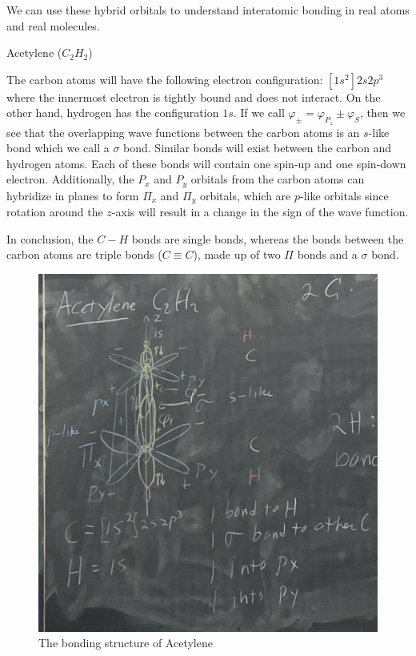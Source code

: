 \documentclass[a4paper,twoside,master.tex]{subfiles}
\begin{document}
We can use these hybrid orbitals to understand interatomic bonding in real atoms and real molecules.

\begin{ex}
    Acetylene ($ C_2 H_2 $)
    
    The carbon atoms will have the following electron configuration: $ [1s^2]2s2p^3 $ where the innermost electron is tightly bound and does not interact. On the other hand, hydrogen has the configuration $ 1s $. If we call $ \varphi_{\pm} = \varphi_{P_z} \pm \varphi_{S} $, then we see that the overlapping wave functions between the carbon atoms is an $ s $-like bond which we call a $ \sigma $ bond. Similar bonds will exist between the carbon and hydrogen atoms. Each of these bonds will contain one spin-up and one spin-down electron. Additionally, the $ P_x $ and $ P_y $ orbitals from the carbon atoms can hybridize in planes to form $ \Pi_x $ and $ \Pi_y $ orbitals, which are $ p $-like orbitals since rotation around the $ z $-axis will result in a change in the sign of the wave function.

    In conclusion, the $ C-H $ bonds are single bonds, whereas the bonds between the carbon atoms are triple bonds ($ C \equiv C $), made up of two $ \Pi $ bonds and a $ \sigma $ bond.

\end{ex}

\begin{figure}[h]
    \centering
    \includegraphics[width=\textwidth/2]{figures/lec_45_acetylene.jpg}
    \caption{The bonding structure of Acetylene}
    \label{fig:acetylene_bonds}
\end{figure}
\end{document}
